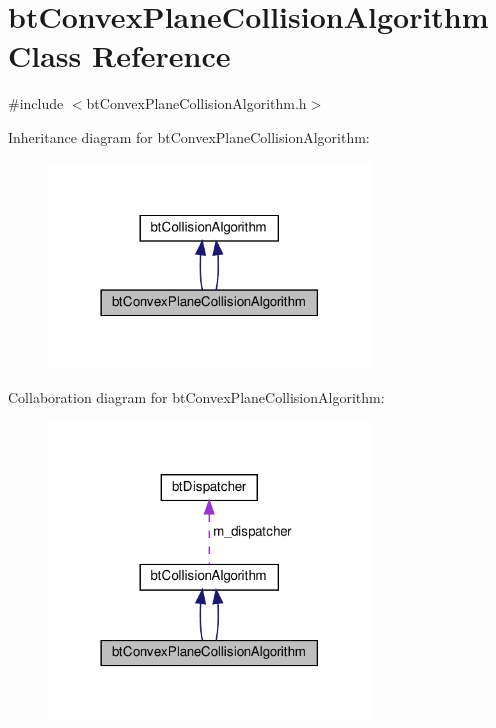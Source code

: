 \hypertarget{classbtConvexPlaneCollisionAlgorithm}{}\section{bt\+Convex\+Plane\+Collision\+Algorithm Class Reference}
\label{classbtConvexPlaneCollisionAlgorithm}


{\ttfamily \#include $<$bt\+Convex\+Plane\+Collision\+Algorithm.\+h$>$}



Inheritance diagram for bt\+Convex\+Plane\+Collision\+Algorithm\+:
\nopagebreak
\begin{figure}[H]
\begin{center}
\leavevmode
\includegraphics[width=242pt]{classbtConvexPlaneCollisionAlgorithm__inherit__graph}
\end{center}
\end{figure}


Collaboration diagram for bt\+Convex\+Plane\+Collision\+Algorithm\+:
\nopagebreak
\begin{figure}[H]
\begin{center}
\leavevmode
\includegraphics[width=242pt]{classbtConvexPlaneCollisionAlgorithm__coll__graph}
\end{center}
\end{figure}
